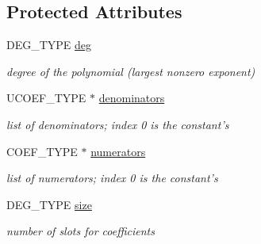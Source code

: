 \subsection*{Protected Attributes}
\begin{DoxyCompactItemize}
\item 
\mbox{\label{class_dense___univariate___rational___polynomial_a1c6da3f7245cd50ec18c5877202fd8f6}} 
D\+E\+G\+\_\+\+T\+Y\+PE \hyperlink{class_dense___univariate___rational___polynomial_a1c6da3f7245cd50ec18c5877202fd8f6}{deg}
\begin{DoxyCompactList}\small\item\em degree of the polynomial (largest nonzero exponent) \end{DoxyCompactList}\item 
\mbox{\label{class_dense___univariate___rational___polynomial_a52dd896ab7091806cd99431c473ba6d0}} 
U\+C\+O\+E\+F\+\_\+\+T\+Y\+PE $\ast$ \hyperlink{class_dense___univariate___rational___polynomial_a52dd896ab7091806cd99431c473ba6d0}{denominators}
\begin{DoxyCompactList}\small\item\em list of denominators; index 0 is the constant's \end{DoxyCompactList}\item 
\mbox{\label{class_dense___univariate___rational___polynomial_ab3f8f2b676e0795601dc037c4d12e078}} 
C\+O\+E\+F\+\_\+\+T\+Y\+PE $\ast$ \hyperlink{class_dense___univariate___rational___polynomial_ab3f8f2b676e0795601dc037c4d12e078}{numerators}
\begin{DoxyCompactList}\small\item\em list of numerators; index 0 is the constant's \end{DoxyCompactList}\item 
\mbox{\label{class_dense___univariate___rational___polynomial_ac1150612197de4b6cb20463fd0c33134}} 
D\+E\+G\+\_\+\+T\+Y\+PE \hyperlink{class_dense___univariate___rational___polynomial_ac1150612197de4b6cb20463fd0c33134}{size}
\begin{DoxyCompactList}\small\item\em number of slots for coefficients \end{DoxyCompactList}\end{DoxyCompactItemize}
